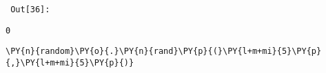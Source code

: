         {\par%
        \vspace{-1\smallerfontscale}%
        \noindent%
        \begin{minipage}{\cellleftmargin}%
    \hfill%
    {\smaller%
    \tt%
    \color{nbframe-out-prompt}%
    Out[36]:}%
    \hspace{\inputpadding}%
    \hspace{0em}%
    \hspace{3pt}%
    \end{minipage}%
        }%
    \begin{addmargin}[\cellleftmargin]{0em}%
    {\smaller%
    \vspace{-1\smallerfontscale}%
    
    
    
    \begin{verbatim}
0
    \end{verbatim}

    
}%
    \end{addmargin}%

{\par%
\vspace{-1\baselineskip}%
}%
\begin{notebookcell}[37]%
\begin{addmargin}[\cellleftmargin]{0em}%
{\smaller%
\par%
%
\vspace{-1\smallerfontscale}%
\begin{Verbatim}[commandchars=\\\{\}]
\PY{n}{random}\PY{o}{.}\PY{n}{rand}\PY{p}{(}\PY{l+m+mi}{5}\PY{p}{,}\PY{l+m+mi}{5}\PY{p}{)}
\end{Verbatim}
%
\par%
\vspace{-1\smallerfontscale}}%
\end{addmargin}
\end{notebookcell}

\par\vspace{1\smallerfontscale}%
    
